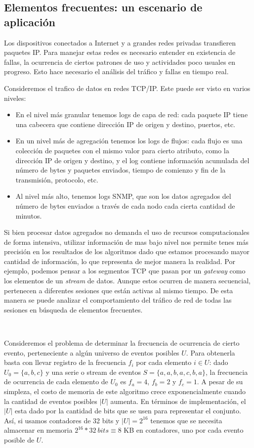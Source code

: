 \documentclass[a4paper,12pt, oneside]{article}
\begin{document}
\subsection{Elementos frecuentes: un escenario de aplicación}
Los dispositivos conectados a Internet y a grandes redes privadas transfieren paquetes IP. Para manejar estas redes es necesario entender en existencia de fallas, la ocurrencia de ciertos patrones de uso y actividades poco usuales en progreso. Esto hace necesario el análisis del tráfico y fallas en tiempo real.

Consideremos el trafico de datos en redes TCP/IP. Este puede ser visto en varios niveles:
\begin{itemize}
	\item En el nivel más granular tenemos logs de capa de red: cada paquete IP tiene una cabecera que contiene dirección IP de origen y destino, puertos, etc.
	\item En un nivel más de agregación tenemos los logs de flujos: cada flujo es una colección de paquetes con el mismo valor para cierto atributo, como la dirección IP de origen y destino, y el log contiene información acumulada del número de bytes y paquetes enviados, tiempo de comienzo y fin de la transmisión, protocolo, etc.
	\item Al nivel más alto, tenemos logs SNMP, que son los datos agregados del número de bytes enviados a través de cada nodo cada cierta cantidad de minutos.
\end{itemize}

Si bien procesar datos agregados no demanda el uso de recursos computacionales de forma intensiva, utilizar información de mas bajo nivel nos permite tenes más precisión en los resultados de los algoritmos dado que estamos procesando mayor cantidad de información, lo que representa de mejor manera la realidad. Por ejemplo, podemos pensar a los segmentos TCP que pasan por un \textit{gateway} como los elementos de un \textit{stream} de datos. Aunque estos ocurren de manera secuencial, pertenecen a diferentes sesiones que están activas al mismo tiempo. De esta manera se puede analizar el comportamiento del tráfico de red de todas las sesiones en búsqueda de elementos frecuentes.

\

Consideremos el problema de determinar la frecuencia de ocurrencia de cierto evento, perteneciente a algún universo de eventos posibles $U$. Para obtenerla basta con llevar registro de la frecuencia $f_i$ por cada elemento $i \in U$: dado $U_0=\{a,b,c\}$ y una serie o stream de eventos $S=\{a,a,b,a,c,b,a\}$, la frecuencia de ocurrencia de cada elemento de $U_0$ es $f_a=4$, $f_b=2$ y $f_c=1$.  A pesar de su simpleza, el costo de memoria de este algoritmo crece exponencialmente cuando la cantidad de eventos posibles $|U|$ aumenta. En términos de implementación, el $|U|$ esta dado por la cantidad de bits que se usen para representar el conjunto. Así, si usamos contadores de 32 bits y $|U|=2^{16}$ tenemos que se necesita almacenar en memoria $2^{16} * 32 \ bits\equiv 8$ KB en contadores, uno por cada evento posible de $U$. 
\end{document}

